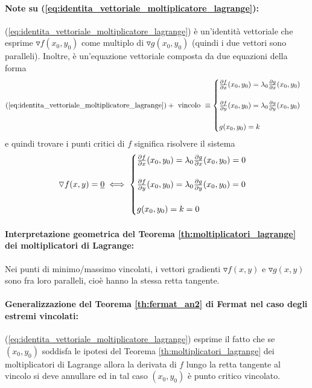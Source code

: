 \paragraph{Note su (\ref{eq:identita_vettoriale_moltiplicatore_lagrange}):} (\ref{eq:identita_vettoriale_moltiplicatore_lagrange}) è un'identità vettoriale che esprime $\triangledown f(x_0,y_0)$ come multiplo di $\triangledown g(x_0, y_0)$ (quindi i due vettori sono paralleli). Inoltre, è un'equazione vettoriale composta da due equazioni della forma
\begin{equation}\label{eq:sistema_moltiplicatore_lagrange}
	(\ref{eq:identita_vettoriale_moltiplicatore_lagrange})+\text{ vincolo }\equiv
	\begin{cases}
		\frac{\partial f}{\partial x} (x_0,y_0) = \lambda_0 \frac{\partial g}{\partial x}(x_0, y_0)\\\\
		\frac{\partial f}{\partial y} (x_0,y_0) = \lambda_0 \frac{\partial g}{\partial y}(x_0, y_0)\\\\
		g(x_0, y_0) = k
	\end{cases}
\end{equation}
e quindi trovare i punti critici di $f$ significa risolvere il sistema
\begin{equation}\label{eq:identita_vettoriale_moltiplicatore_lagrange_0}
	\triangledown f(x,y) = \uline 0 \iff
	\begin{cases}
		\frac{\partial f}{\partial x} (x_0,y_0) = \lambda_0 \frac{\partial g}{\partial x}(x_0, y_0) = 0\\\\
		\frac{\partial f}{\partial y} (x_0,y_0) = \lambda_0 \frac{\partial g}{\partial y}(x_0, y_0) = 0\\\\
		g(x_0, y_0) = k = 0
	\end{cases}
\end{equation}
 
\paragraph{Interpretazione geometrica del Teorema \ref{th:moltiplicatori_lagrange} dei moltiplicatori di Lagrange:} Nei punti di minimo/massimo vincolati, i vettori gradienti $\triangledown f(x,y)$ e $\triangledown g(x,y)$ sono fra loro paralleli, cioè hanno la stessa retta tangente.

\paragraph{Generalizzazione del Teorema \ref{th:fermat_an2} di Fermat nel caso degli estremi vincolati:} (\ref{eq:identita_vettoriale_moltiplicatore_lagrange}) esprime il fatto che se $(x_0, y_0)$ soddisfa le ipotesi del Teorema \ref{th:moltiplicatori_lagrange} dei moltiplicatori di Lagrange allora la derivata di $f$ lungo la retta tangente al vincolo si deve annullare ed in tal caso $(x_0, y_0)$ è punto critico vincolato.

